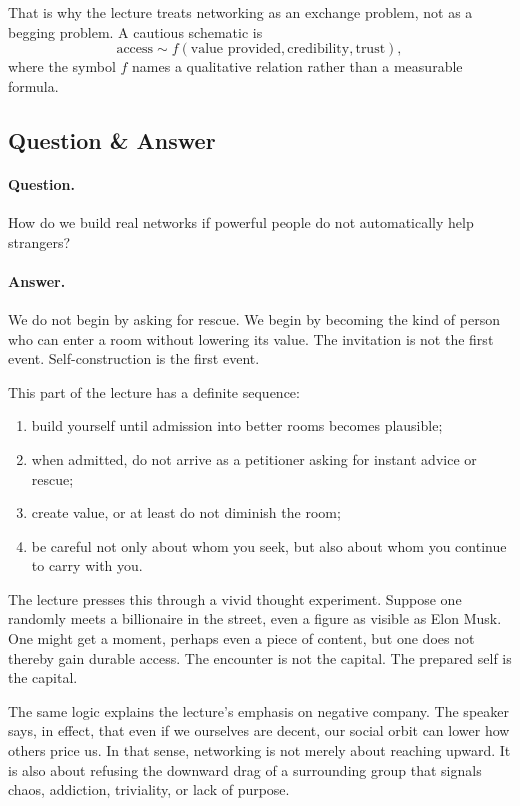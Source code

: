 That is why the lecture treats networking as an exchange problem, not as a begging problem. A cautious schematic is
\begin{equation}
\text{access} \sim f(\text{value provided},\text{credibility},\text{trust}),
\end{equation}
where the symbol \(f\) names a qualitative relation rather than a measurable formula.

\subsection{Question \& Answer}

\paragraph{Question.} How do we build real networks if powerful people do not automatically help strangers?

\paragraph{Answer.} We do not begin by asking for rescue. We begin by becoming the kind of person who can enter a room without lowering its value. The invitation is not the first event. Self-construction is the first event.

This part of the lecture has a definite sequence:
\begin{enumerate}
\item build yourself until admission into better rooms becomes plausible;
\item when admitted, do not arrive as a petitioner asking for instant advice or rescue;
\item create value, or at least do not diminish the room;
\item be careful not only about whom you seek, but also about whom you continue to carry with you.
\end{enumerate}

The lecture presses this through a vivid thought experiment. Suppose one randomly meets a billionaire in the street, even a figure as visible as Elon Musk. One might get a moment, perhaps even a piece of content, but one does not thereby gain durable access. The encounter is not the capital. The prepared self is the capital.

The same logic explains the lecture's emphasis on negative company. The speaker says, in effect, that even if we ourselves are decent, our social orbit can lower how others price us. In that sense, networking is not merely about reaching upward. It is also about refusing the downward drag of a surrounding group that signals chaos, addiction, triviality, or lack of purpose.

